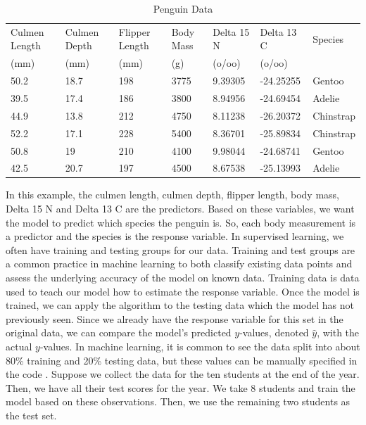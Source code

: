 \documentclass[12pt]{article}
\begin{document}
\begin{table}[ht]
    \centering
    \begin{tabular}{p{1.5cm}p{1.5cm}p{1.5cm}p{1.2cm}p{1.9cm}p{1.9cm}p{1.9cm}}
         Culmen Length & Culmen Depth & Flipper Length & Body Mass & Delta 15 N & Delta 13 C & Species \\
         (mm) & (mm) & (mm) & (g) & (o/oo) & (o/oo) \\
         \hline
         50.2 & 18.7 & 198 & 3775 & 9.39305 & -24.25255 & Gentoo \\
         39.5 & 17.4 & 186 & 3800 & 8.94956 & -24.69454 & Adelie \\
         44.9 & 13.8 & 212 & 4750 & 8.11238 & -26.20372 & Chinstrap \\
         52.2 & 17.1 & 228 & 5400 & 8.36701 & -25.89834 & Chinstrap \\
         50.8 & 19 & 210 & 4100 & 9.98044 & -24.68741 & Gentoo \\
         42.5 & 20.7 & 197 & 4500 & 8.67538 & -25.13993 & Adelie
    \end{tabular}
    \caption{Penguin Data}
    \label{table_penguin_data}
\end{table}

In this example, the culmen length, culmen depth, flipper length, body mass, Delta 15 N and Delta 13 C are the predictors. Based on these variables, we want the model to predict which species the penguin is. So, each body measurement is a predictor and the species is the response variable. In supervised learning, we often have training and testing groups for our data. Training and test groups are a common practice in machine learning to both classify existing data points and assess the underlying accuracy of the model on known data. Training data is data used to teach our model how to estimate the response variable. Once the model is trained, we can apply the algorithm to the testing data which the model has not previously seen. Since we already have the response variable for this set in the original data, we can compare the model's predicted $y$-values, denoted $\hat y$, with the actual $y$-values. In machine learning, it is common to see the data split into about 80\% training and 20\% testing data, but these values can be manually specified in the code \cite{trainingvtest}. Suppose we collect the data for the ten students at the end of the year. Then, we have all their test scores for the year. We take 8 students and train the model based on these observations. Then, we use the remaining two students as the test set. 
\end{document}

